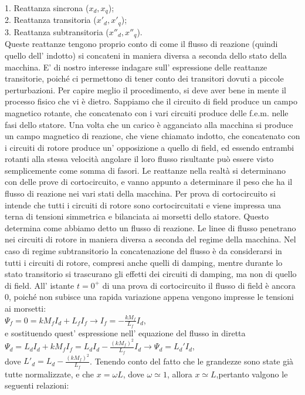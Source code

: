 \documentclass[Lau,noexaminfo]{sapthesis}
\begin{document}
	1. Reattanza sincrona ($x_d, x_q$);\\
	2. Reattanza transitoria ($x'_d, x'_q$);\\
	3. Reattanza subtransitoria ($x''_d,x''_q$).\\
	Queste reattanze tengono proprio conto di come il flusso di reazione (quindi quello dell' indotto) si concateni in maniera diversa a seconda dello stato della macchina. E' di nostro interesse indagare sull' espressione delle reattanze transitorie, poiché ci permettono di tener conto dei transitori dovuti a piccole perturbazioni.
	Per capire meglio il procedimento, si deve aver bene in mente il processo fisico che vi è dietro. Sappiamo che il circuito di field produce un campo magnetico rotante, che concatenato con i vari circuiti produce delle f.e.m. nelle fasi dello statore. Una volta che un carico è agganciato alla macchina si produce un campo magnetico di reazione, che viene chiamato indotto, che concatenato con i circuiti di rotore produce un' opposizione a quello di field, ed essendo entrambi rotanti alla stessa velocità angolare il loro flusso risultante può essere visto semplicemente come somma di fasori. Le reattanze nella realtà si determinano con delle prove di cortocircuito, e vanno appunto a determinare il peso che ha il flusso di reazione nei vari stati della macchina. Per prova di cortocircuito si intende che tutti i circuiti di rotore sono cortocircuitati e viene impressa una terna di tensioni simmetrica  e bilanciata ai morsetti dello statore. Questo determina come abbiamo detto un flusso di reazione. Le linee di flusso penetrano nei circuiti di rotore in maniera diversa a seconda del regime della macchina. Nel caso di regime subtransitorio la concatenazione del flusso è da considerarsi in tutti i circuiti di rotore, compresi anche quelli di damping, mentre durante lo stato transitorio si trascurano gli effetti dei circuiti di damping, ma non di quello di field. All' istante $t=0^+$ di una prova di cortocircuito il flusso di field è ancora 0, poiché non subisce una rapida variazione appena vengono impresse le tensioni ai morsetti:\\
	$\Psi_f=0=kM_fI_d+L_fI_f \rightarrow I_f=-\frac{kM_f}{L_f}I_d$,\\
	e sostituendo quest' espressione nell' equazione del flusso in diretta\\
	$\Psi_d=L_dI_d+kM_fI_f=L_dI_d-\frac{(kM_f)^2}{L_f}I_d \rightarrow \Psi_d=L_d'I_d$,\\
	dove $L'_d=L_d-\frac{(kM_f)^2}{L_f}$. Tenendo conto del fatto che le grandezze sono state già tutte normalizzate, e che $x=\omega L$, dove $\omega\simeq1$, allora $x\simeq L$,pertanto valgono le seguenti relazioni:\\
\end{document}

